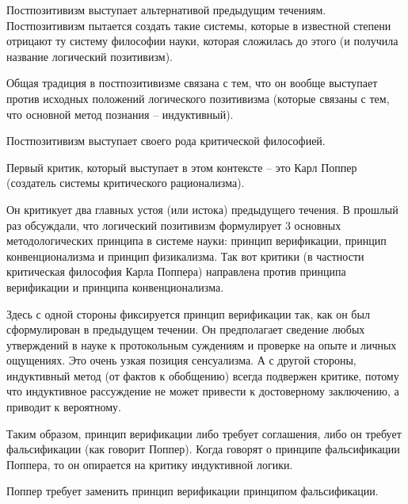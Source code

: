 \documentclass[main.tex]{subfiles}
\begin{document}


Постпозитивизм выступает альтернативой предыдущим течениям.
Постпозитивизм пытается создать такие системы, которые в известной степени отрицают ту систему философии науки, которая сложилась до этого (и получила название логический позитивизм).

Общая традиция в постпозитивизме связана с тем, что он вообще выступает против исходных положений логического позитивизма (которые связаны с тем, что основной метод познания -- индуктивный).

Постпозитивизм выступает своего рода критической философией.



Первый критик, который выступает в этом контексте -- это Карл Поппер (создатель системы критического рационализма).

Он критикует два главных устоя (или истока) предыдущего течения.
В прошлый раз обсуждали, что логический позитивизм формулирует 3 основных методологических принципа в системе науки: принцип верификации, принцип конвенционализма и принцип физикализма.
Так вот критики (в частности критическая философия Карла Поппера) направлена против принципа верификации и принципа конвенционализма.



Здесь с одной стороны фиксируется принцип верификации так, как он был сформулирован в предыдущем течении.
Он предполагает сведение любых утверждений в науке к протокольным суждениям и проверке на опыте и личных ощущениях.
Это очень узкая позиция сенсуализма.
А с другой стороны, индуктивный метод (от фактов к обобщению) всегда подвержен критике, потому что индуктивное рассуждение не может привести к достоверному заключению, а приводит к вероятному.

Таким образом, принцип верификации либо требует соглашения, либо он требует фальсификации (как говорит Поппер).
Когда говорят о принципе фальсификации Поппера, то он опирается на критику индуктивной логики.

Поппер требует заменить принцип верификации принципом фальсификации.

\end{document}
